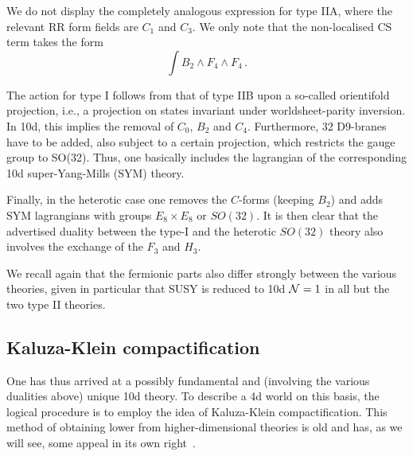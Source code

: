 \documentclass[12pt]{article}
\newcommand{\be}{\begin{equation}}
\newcommand{\ee}{\end{equation}}
\numberwithin{equation}{section}
\begin{document}
We do not display the completely analogous expression for type IIA, where the relevant RR form fields are $C_1$ and $C_3$. We only note that the non-localised CS term takes the form
\be
\int B_2\wedge F_4\wedge F_4\,.
\ee

The action for type I follows from that of type IIB upon a so-called orientifold projection, i.e., a projection on states invariant under worldsheet-parity inversion.  In 10d, this implies the removal of $C_0$, $B_2$ and $C_4$. Furthermore, 32 D9-branes have to be added, also subject to a certain projection, which restricts the gauge group to SO(32). Thus, one basically includes the lagrangian of the corresponding 10d super-Yang-Mills (SYM) theory.

Finally, in the heterotic case one removes the $C$-forms (keeping $B_2$) and adds SYM lagrangians with groups $E_8\times E_8$ or $SO(32)$. It is then clear that the advertised duality between the type-I and the heterotic $SO(32)$ theory also involves the exchange of the $F_3$ and $H_3$. 

We recall again that the fermionic parts also differ strongly between the various theories, given in particular that SUSY is reduced to 10d ${\cal N}=1$ in all but the two type II theories.






\subsection{Kaluza-Klein compactification}\label{kkc}

One has thus arrived at a possibly fundamental and (involving the various dualities above) unique 10d theory. To describe a 4d world on this basis, the logical procedure is to employ the idea of Kaluza-Klein compactification. This method of obtaining lower from higher-dimensional theories is old and has, as we will see, some appeal in its own right~\cite{Nordstrom:1988fi, Klein:1926tv, Klein:1926fj, Appelquist:1987nr, Duff:1994tn, Overduin:1998pn}.
\end{document}
